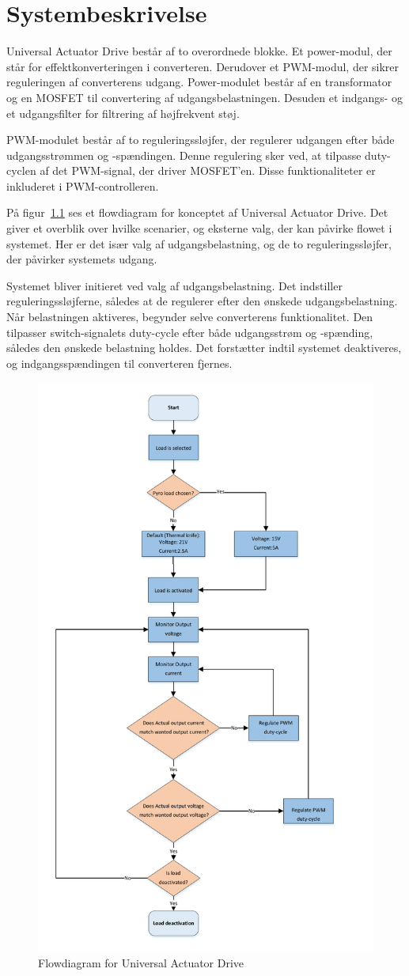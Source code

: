 
\chapter{Systembeskrivelse}
Universal Actuator Drive består af to overordnede blokke. Et power-modul, der står for effektkonverteringen i converteren. Derudover et PWM-modul, der sikrer reguleringen af converterens udgang. Power-modulet består af en transformator og en MOSFET til convertering af udgangsbelastningen. Desuden et indgangs- og et udgangsfilter for filtrering af højfrekvent støj.

PWM-modulet består af to reguleringssløjfer, der regulerer udgangen efter både udgangsstrømmen og -spændingen. Denne regulering sker ved, at tilpasse duty-cyclen af det PWM-signal, der driver MOSFET'en. Disse funktionaliteter er inkluderet i PWM-controlleren. 

På figur~\ref{fig:flowdiagram} ses et flowdiagram for konceptet af Universal Actuator Drive. Det giver et overblik over hvilke scenarier, og eksterne valg, der kan påvirke flowet i systemet. Her er det især valg af udgangsbelastning, og de to reguleringssløjfer, der påvirker systemets udgang.

Systemet bliver initieret ved valg af udgangsbelastning. Det indstiller reguleringssløjferne, således at de regulerer efter den ønskede udgangsbelastning. Når belastningen aktiveres, begynder selve converterens funktionalitet. Den tilpasser switch-signalets duty-cycle efter både udgangsstrøm og -spænding, således den ønskede belastning holdes. Det forstætter indtil systemet deaktiveres, og indgangsspændingen til converteren fjernes. 

\begin{figure}[H]
	\centering
	\includegraphics[width=0.7\linewidth]{../Dokumentation/tex/kravspecifikation/billeder/Flow_diagram.pdf}
	\caption{Flowdiagram for Universal Actuator Drive}
	\label{fig:flowdiagram}
\end{figure}